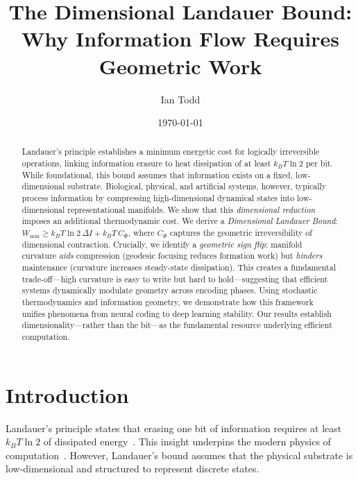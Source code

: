 \documentclass[aps,prx,twocolumn,superscriptaddress,floatfix]{revtex4-2}
\begin{document}
\title{The Dimensional Landauer Bound: Why Information Flow Requires Geometric Work}

\author{Ian Todd}

\date{\today}

\begin{abstract}
Landauer's principle establishes a minimum energetic cost for logically irreversible operations, linking information erasure to heat dissipation of at least $k_B T \ln 2$ per bit. While foundational, this bound assumes that information exists on a fixed, low-dimensional substrate. Biological, physical, and artificial systems, however, typically process information by compressing high-dimensional dynamical states into low-dimensional representational manifolds. We show that this \emph{dimensional reduction} imposes an additional thermodynamic cost. We derive a \emph{Dimensional Landauer Bound}: $W_{\min} \ge k_B T \ln 2\, \Delta I + k_B T\, C_\Phi$, where $C_\Phi$ captures the geometric irreversibility of dimensional contraction. Crucially, we identify a \emph{geometric sign flip}: manifold curvature \emph{aids} compression (geodesic focusing reduces formation work) but \emph{hinders} maintenance (curvature increases steady-state dissipation). This creates a fundamental trade-off---high curvature is easy to write but hard to hold---suggesting that efficient systems dynamically modulate geometry across encoding phases. Using stochastic thermodynamics and information geometry, we demonstrate how this framework unifies phenomena from neural coding to deep learning stability. Our results establish dimensionality---rather than the bit---as the fundamental resource underlying efficient computation.
\end{abstract}

\maketitle

\section{Introduction}

Landauer's principle states that erasing one bit of information requires at least $k_B T \ln 2$ of dissipated energy~\cite{landauer1961,berut2012}. This insight underpins the modern physics of computation~\cite{bennett1982,parrondo2015}. However, Landauer's bound assumes that the physical substrate is low-dimensional and structured to represent discrete states.
\end{document}
